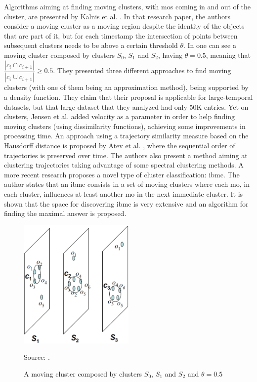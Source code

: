 Algorithms aiming at finding moving clusters, with \acp{mo} coming in and out of the cluster, are presented by Kalnis et
al. \citep{movingclusters}. In that research paper, the authors consider a moving cluster as a moving region despite the
identity of the objects that are part of it, but for each timestamp the intersection of points between subsequent
clusters needs to be above a certain threshold $\theta$. In  one can see a moving cluster composed
by clusters $S_0$, $S_1$ and $S_2$, having $\theta=0.5$, meaning that $\dfrac{|c_i \cap c_{i+1}|}{|c_i \cup c_{i+1}|}
\geq 0.5$. They presented three different approaches to find moving clusters (with one of them being an approximation
method), being supported by a density function. They claim that their proposal is applicable for large-temporal
datasets, but that large dataset that they analyzed had only 50K entries. Yet on clusters, Jensen et al.
\citep{clusters3} added velocity as a parameter in order to help finding moving clusters (using dissimilarity
functions), achieving some improvements in processing time. An approach using a trajectory similarity measure based on
the Hausdorff distance is proposed by Atev et al. \citep{clusters2}, where the sequential order of trajectories is
preserved over time. The authors also present a method aiming at clustering trajectories taking advantage of some
spectral clustering methods. A more recent research \citep{clusters1} proposes a novel type of cluster classification:
\ac{ibmc}. The author states that an \ac{ibmc} consists in a set of moving clusters where each \ac{mo}, in each cluster,
influences at least another \ac{mo} in the next immediate cluster. It is shown that the space for discovering \ac{ibmc}
is very extensive and an algorithm for finding the maximal answer is proposed.

\begin{figure}
    \centering
    \caption{A moving cluster composed by clusters $S_0$, $S_1$ and $S_2$ and $\theta=0.5$}
    \centerline{\includegraphics[width=0.5\textwidth]{images/clusters.eps}}
    \footnotesize{Source: \citep{movingclusters}.}
    \label{fig:clusters}
\end{figure}

